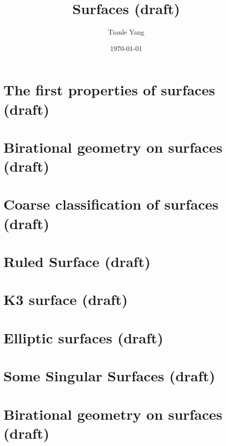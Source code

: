 \documentclass[sectionlevel=chapter]{noteformyself}
\title{Surfaces (draft)}
\author{Tianle Yang}
\date{\today}
\begin{document}
    \maketitle

    \tableofcontents

    \section{The first properties of surfaces (draft)}
    
    \section{Birational geometry on surfaces (draft)}
    
    \section{Coarse classification of surfaces (draft)}
    
    \section{Ruled Surface (draft)}
    
    \section{K3 surface (draft)}
    
    \section{Elliptic surfaces (draft)}
    
    \section{Some Singular Surfaces (draft)}
    
    \section{Birational geometry on surfaces (draft)}
    

    
\end{document}

